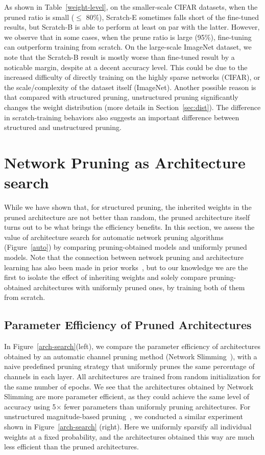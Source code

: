 As shown in Table~\ref{weight-level}, on the smaller-scale CIFAR datasets, when the pruned ratio is small ($\le$ 80\%), 
Scratch-E sometimes falls short of the fine-tuned results, but Scratch-B is able to perform at least on par with the latter. However, we observe that in some cases, when the prune ratio is large (95\%), fine-tuning can outperform training from scratch. 
On the large-scale ImageNet dataset, we note that the Scratch-B result is mostly worse than fine-tuned result by a noticable margin, despite at a decent accuracy level. 
 This could be due to the increased difficulty of directly training on the highly sparse networks (CIFAR), or the scale/complexity of the dataset itself (ImageNet). Another possible reason is that compared with structured pruning, unstructured pruning significantly changes the weight distribution (more details in Section~\ref{sec:dist}). The difference in scratch-training behaviors also suggests an important difference between structured and unstructured pruning.

\section{Network Pruning as Architecture search}
\label{sec:arch}

While we have shown that, for structured pruning, the inherited weights in the pruned architecture are not better than random, the pruned architecture itself turns out to be what brings the efficiency benefits. 
In this section, we assess the value of architecture search for automatic network pruning algorithms (Figure~\ref{auto}) by comparing pruning-obtained models and uniformly pruned models. Note that the connection between network pruning and architecture learning has also been made in prior works~\cite{han2015learning,liu2017learning,gordon2018morphnet,huang2018condensenet}, but to our knowledge we are the first to isolate the effect of inheriting weights and solely compare pruning-obtained architectures with uniformly pruned ones, by training both of them from scratch.


\subsection{Parameter Efficiency of Pruned Architectures}
In Figure~\ref{arch-search}(left), we compare the parameter efficiency of architectures obtained by an automatic channel pruning method (Network Slimming~\cite{liu2017learning}),  with a naive predefined pruning strategy that uniformly prunes the same percentage of channels in each layer. All architectures are trained from random initialization for the same number of epochs. We see that the architectures obtained by Network Slimming are more parameter efficient, as they could achieve the same level of accuracy using 5$\times$ fewer parameters than uniformly pruning architectures. 
For unstructured magnitude-based pruning~\cite{han2015learning}, we conducted a similar experiment shown in Figure~\ref{arch-search} (right). Here we uniformly sparsify all individual weights at a fixed probability, and the architectures obtained this way are much less efficient than the pruned architectures. 

